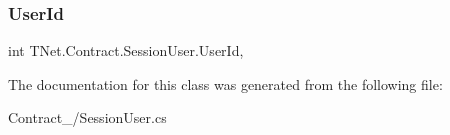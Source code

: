 \mbox{\label{class_t_net_1_1_contract_1_1_session_user_a9e7899566c3356929de2ce5ec07d2210}} 
\subsubsection{\texorpdfstring{User\+Id}{UserId}}
{\footnotesize\ttfamily int T\+Net.\+Contract.\+Session\+User.\+User\+Id\hspace{0.3cm}{\ttfamily [get]}, {\ttfamily [set]}}







The documentation for this class was generated from the following file\+:\begin{DoxyCompactItemize}
\item 
Contract\+\_\+/Session\+User.\+cs\end{DoxyCompactItemize}
